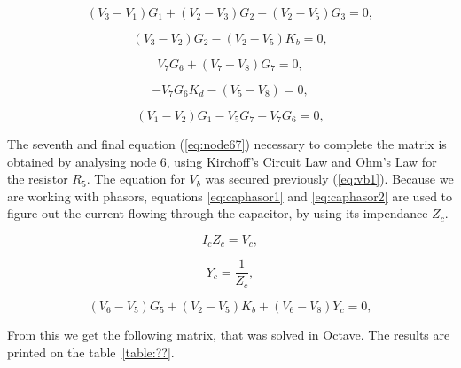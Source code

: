 \begin{equation}
  (V_{3} - V_{1})G_{1} + (V_{2} - V_{3})G_{2} + (V_{2} - V_{5})G_{3}= 0,
  \label{eq:node42}
\end{equation}

\begin{equation}
  (V_{3} - V_{2})G_{2} - (V_{2} - V_{5})K_{b} = 0,
  \label{eq:node43}
\end{equation}


\begin{equation}
  V_{7}G_{6} + (V_{7} - V_{8})G_{7} = 0,
  \label{eq:node47}
\end{equation}


\begin{equation}
  -V_{7}G_{6}K_{d} - (V_{5} - V_{8}) = 0,
  \label{eq:vd4}
\end{equation}

\begin{equation}
  (V_{1} - V_{2})G_{1} - V_{5}G_{7} - V_{7}G_{6} = 0,
  \label{eq:supernode4}
\end{equation}

The seventh and final equation (\ref{eq:node67}) necessary to complete the matrix is obtained by analysing node 6, using Kirchoff's Circuit Law and Ohm's Law for the resistor $R_5$. The equation for $V_b$ was secured previously (\ref{eq:vb1}). Because we are working with phasors, equations \ref{eq:caphasor1} and \ref{eq:caphasor2} are used to figure out the current flowing through the capacitor, by using its impendance $Z_c$.


\begin{equation}
  I_{c}Z_{c} = V_{c},
  \label{eq:caphasor1}
\end{equation}

\begin{equation}
 Y_c = \frac{1}{Z_c},
  \label{eq:caphasor2}
\end{equation}

\begin{equation}
   (V_{6} - V_{5})G_{5} + (V_{2} - V_{5})K_{b} + (V_{6} - V_{8})Y_{c} = 0,
  \label{eq:node67}
\end{equation}

From this we get the following matrix, that was solved in Octave. The results are printed on the table~\ref{table:??}.

